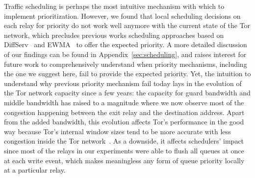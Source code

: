 Traffic scheduling is
perhaps the most intuitive mechanism with which to implement
prioritization. However, we found that local scheduling decisions on each relay for priority do not work well anymore with the current state of the Tor network, which precludes previous works scheduling approaches based on DiffServ~\cite{dovrolis1999case} and EWMA~\cite{tang2010improved} to offer the expected priority. A more detailed
discussion of our findings can be found in Appendix~\ref{sec:scheduling}, and raises interest for future work to comprehensively understand when priority mechanisms, including the one we suggest here, fail to provide the expected priority. Yet, the intuition to understand why previous priority mechanism fail today lays in the evolution of the Tor network capacity since a few years: the capacity for guard bandwidth and middle bandwidth has raised to a magnitude where we now observe most of the congestion happening between the exit relay and the destination address. Apart from the added bandwidth, this evolution affects Tor's performance in the good way because Tor's internal window sizes tend to be more accurate with less congestion inside the Tor network~\cite{archive-2009-mail,kiraly2008solving}. As a downside, it affects schedulers' impact since most of the relays in our experiments were able to flush all queues at once at each write event, which makes meaningless any form of queue priority locally at a particular relay.

